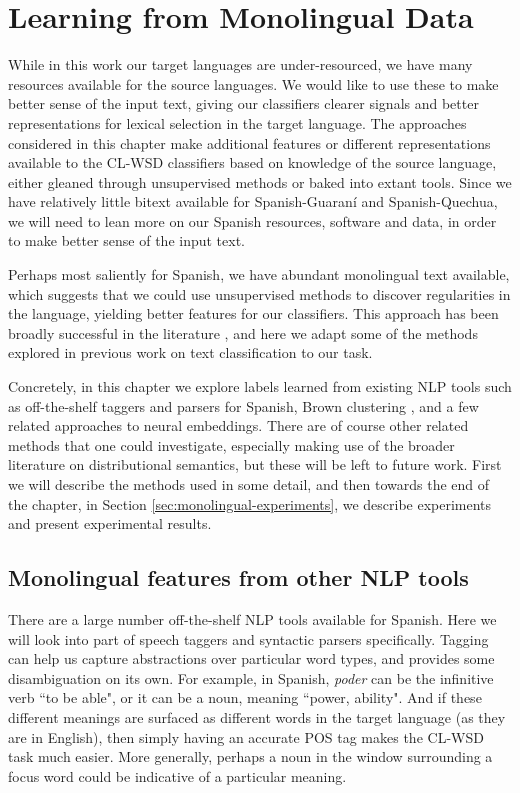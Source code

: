 \chapter{Learning from Monolingual Data}
\label{chap:monolingual}
While in this work our target languages are under-resourced, we have many
resources available for the source languages. We would like to use these to
make better sense of the input text, giving our classifiers clearer signals and
better representations for lexical selection in the target language. The
approaches considered in this chapter make additional features or different
representations available to the CL-WSD classifiers based on knowledge of the
source language, either gleaned through unsupervised methods or baked into
extant tools. Since we have relatively little bitext available for
Spanish-Guaraní and Spanish-Quechua, we will need to lean more on our Spanish
resources, software and data, in order to make better sense of the input text.

Perhaps most saliently for Spanish, we have abundant monolingual text
available, which suggests that we could use unsupervised methods to discover
regularities in the language, yielding better features for our classifiers.
This approach has been broadly successful in the literature
\cite{turian-ratinov-bengio:2010:ACL,baroni2014don}, and here we adapt some of
the methods explored in previous work on text classification to our task.

Concretely, in this chapter we explore labels learned from existing NLP tools
such as off-the-shelf taggers and parsers for Spanish, Brown clustering
\cite{brown1992class}, and a few related approaches to neural embeddings. There
are of course other related methods that one could investigate, especially
making use of the broader literature on distributional semantics, but these
will be left to future work. First we will describe the methods used in some
detail, and then towards the end of the chapter, in Section
\ref{sec:monolingual-experiments}, we describe experiments and present
experimental results.

\section{Monolingual features from other NLP tools}
There are a large number off-the-shelf NLP tools available for Spanish. Here we
will look into part of speech taggers and syntactic parsers specifically.
Tagging can help us capture abstractions over particular word types, and
provides some disambiguation on its own. For example, in Spanish, \emph{poder}
can be the infinitive verb ``to be able", or it can be a noun, meaning ``power,
ability". And if these different meanings are surfaced as different words in
the target language (as they are in English), then simply having an accurate
POS tag makes the CL-WSD task much easier. More generally, perhaps a noun in
the window surrounding a focus word could be indicative of a particular
meaning.

